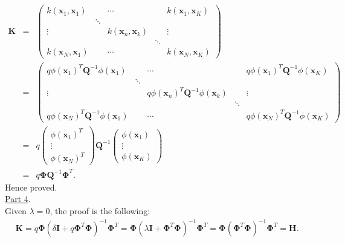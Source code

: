 \documentclass[a4paper, 11pt]{article}
\begin{document}
\begin{eqnarray}
\mathbf{K} &=& \left( \begin{array}{ccccc}
k(\mathbf{x}_1, \mathbf{x}_1) & & \cdots & & k(\mathbf{x}_1, \mathbf{x}_K) \\
 & \ddots & & & \\
\vdots & & k(\mathbf{x}_n, \mathbf{x}_k) & & \vdots \\
 & & & \ddots & \\
k(\mathbf{x}_N, \mathbf{x}_1) & & \cdots & & k(\mathbf{x}_N, \mathbf{x}_K) \end{array} \right) \nonumber \\
&=& \left( \begin{array}{ccccc}
q \phi (\mathbf{x}_1)^T \mathbf{Q}^{-1} \phi (\mathbf{x}_1) & & \cdots & & q \phi (\mathbf{x}_1)^T \mathbf{Q}^{-1} \phi (\mathbf{x}_K) \\
 & \ddots & & & \\
\vdots & & q \phi (\mathbf{x}_n)^T \mathbf{Q}^{-1} \phi (\mathbf{x}_k) & & \vdots \\
 & & & \ddots & \\
q \phi (\mathbf{x}_N)^T \mathbf{Q}^{-1} \phi (\mathbf{x}_1) & & \cdots & & q \phi (\mathbf{x}_N)^T \mathbf{Q}^{-1} \phi (\mathbf{x}_K) \end{array} \right) \nonumber \\
&=& q \left( \begin{array}{c}
\phi (\mathbf{x}_1)^T \\
\vdots \\
\phi (\mathbf{x}_N)^T \end{array} \right) \mathbf{Q}^{-1} \left( \begin{array}{c}
\phi (\mathbf{x}_1) \\
\vdots \\
\phi (\mathbf{x}_K) \end{array} \right) \nonumber \\
&=& q \mathbf{\Phi} \mathbf{Q}^{-1} \mathbf{\Phi}^T. \nonumber
\end{eqnarray}
Hence proved.\\
\newline \underline{Part 4}. \\
\newline Given $\lambda = 0$, the proof is the following:
\begin{eqnarray}
\mathbf{K} = q \mathbf{\Phi} (\delta \mathbf{I} + q \mathbf{\Phi}^T \mathbf{\Phi})^{-1} \mathbf{\Phi}^T = \mathbf{\Phi} (\lambda \mathbf{I} + \mathbf{\Phi}^T \mathbf{\Phi})^{-1} \mathbf{\Phi}^T = \mathbf{\Phi} (\mathbf{\Phi}^T \mathbf{\Phi})^{-1} \mathbf{\Phi}^T = \mathbf{H}. \nonumber
\end{eqnarray}
\end{document}
